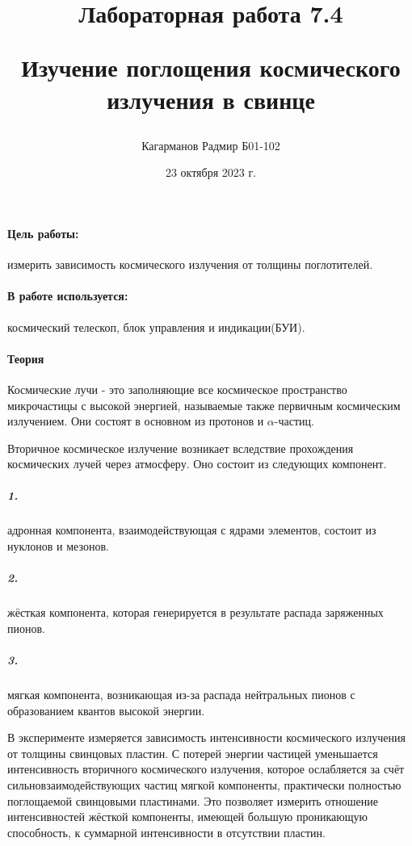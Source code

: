 \documentclass[a4paper,12pt]{article}
\title{Лабораторная работа 7.4

Изучение поглощения космического излучения в свинце}
\author{Кагарманов Радмир Б01-102}
\date{23 октября 2023 г.}
\begin{document}
\maketitle
\thispagestyle{empty}
\newpage
\setcounter{page}{1}

\paragraph{Цель работы:} измерить зависимость космического излучения от толщины поглотителей.

\paragraph{В работе используется:} космический телескоп, блок управления и индикации(БУИ).

\paragraph{Теория\\}
Космические лучи - это заполняющие все космическое пространство микрочастицы с высокой энергией, называемые также первичным космическим излучением.
Они состоят в основном из протонов и $\alpha$-частиц.\par
Вторичное космическое излучение возникает вследствие прохождения космических лучей через атмосферу. Оно состоит из следующих компонент.
\subparagraph{1.} адронная компонента, взаимодействующая с ядрами элементов, состоит из нуклонов и мезонов.
\subparagraph{2.} жёсткая компонента, которая генерируется в результате распада заряженных пионов.
\subparagraph{3.} мягкая компонента, возникающая из-за распада нейтральных пионов с образованием квантов высокой энергии.\\ \par
В эксперименте измеряется зависимость интенсивности космического излучения от толщины свинцовых пластин. С потерей энергии частицей уменьшается интенсивность вторичного космического излучения, которое ослабляется за счёт сильновзаимодействующих частиц мягкой компоненты, практически полностью поглощаемой свинцовыми пластинами. Это позволяет измерить отношение интенсивностей жёсткой компоненты, имеющей большую проникающую способность, к суммарной интенсивности в отсутствии пластин.
\end{document}
